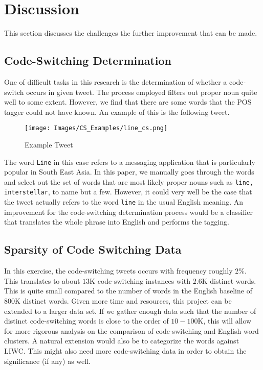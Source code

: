 \documentclass[conference]{IEEEtran}
\begin{document}
\section{Discussion}
This section discusses the challenges the further improvement that can be made. 
\subsection{Code-Switching Determination}
One of  difficult tasks in this research is the determination of whether a code-switch occurs in given tweet. 
The process employed filters out proper noun  quite well to some extent. However, we find that there are some words that the POS tagger could not have known. An example of this is the following tweet. 


\begin{figure}[H]
	\centering
	\texttt{[image: Images/CS\_Examples/line\_cs.png]}
	\caption{Example Tweet}
	\label{fig:GS_compare_column_alpha}
\end{figure}

The word {\tt Line} in this case refers to a messaging application that is particularly popular in South East Asia. In this paper, we manually goes through the words and select out the set of words that are most likely proper nouns such as {\tt line, interstellar}, to name but a few. However, it could very well be the case that the tweet actually refers to the word {\tt line} in the usual English meaning.  An improvement for the code-switching determination process would be a classifier that translates the whole phrase into English and performs the tagging. 


\subsection{Sparsity of Code Switching Data}
In this exercise, the  code-switching tweets occurs with frequency roughly $2 \% $. This translates to about $13$K code-switching instances with $2.6$K distinct words. This is quite small compared to the number of words in the English baseline of $800$K distinct words. Given more time and resources, this project can be extended to a larger data set. If we gather enough data such that the number of distinct code-switching words is close to the order of $10-100$K, this will allow for more rigorous analysis on the comparison of code-switching and English word clusters. A natural extension would also be to categorize the words against LIWC. This might also need more code-switching data in order to obtain the significance (if any) as well. 
\end{document}
